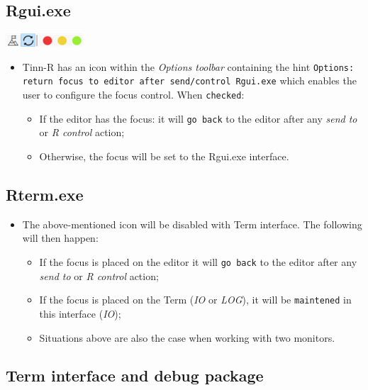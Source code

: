 \subsection{Rgui.exe}

\includegraphics[scale=0.50]{./res/focus.png}

\begin{itemize}
  \item Tinn-R has an icon within the \textit{Options toolbar}
    containing the hint \texttt{Options: return focus to editor
      after send/control Rgui.exe} which enables the user to configure
    the focus control. When \texttt{checked}:
    \begin{itemize}
      \item If the editor has the focus: it will \texttt{go back}
        to the editor after any \textit{send to} or \textit{R control}
        action;
      \item Otherwise, the focus will be set to the Rgui.exe interface.
    \end{itemize}
\end{itemize}


\subsection{Rterm.exe}

\begin{itemize}
  \item The above-mentioned icon will be disabled with Term interface.
    The following will then happen:
    \begin{itemize}
      \item If the focus is placed on the editor it will \texttt{go back}
        to the editor after any \textit{send to} or \textit{R control} action;
      \item If the focus is placed on the Term (\textit{IO} or \textit{LOG}),
        it will be \texttt{maintened} in this interface (\textit{IO});
      \item Situations above are also the case when working with two monitors.
    \end{itemize}
\end{itemize}


\newpage
\subsection{Term interface and debug package}

